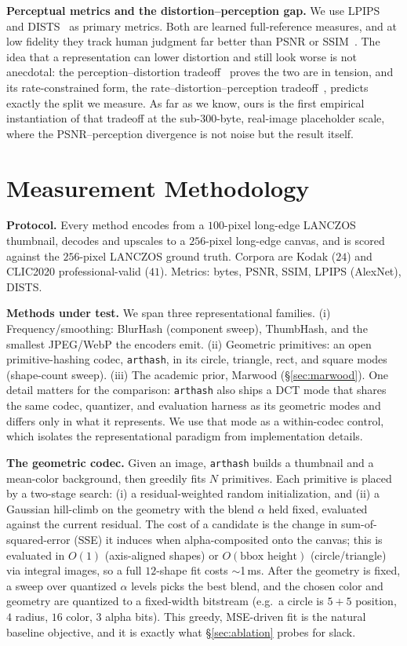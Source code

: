 \documentclass[11pt]{article}
\begin{document}
\textbf{Perceptual metrics and the distortion--perception gap.} We use
LPIPS~\cite{lpips} and DISTS~\cite{dists} as primary metrics. Both are learned
full-reference measures, and at low fidelity they track human judgment far
better than PSNR or SSIM~\cite{wang2009mse}. The idea that a representation can
lower distortion and still look worse is not anecdotal: the
perception--distortion tradeoff~\cite{blau2018perception} proves the two are in
tension, and its rate-constrained form, the rate--distortion--perception
tradeoff~\cite{rdp}, predicts exactly the split we measure. As far as we know,
ours is the first empirical instantiation of that tradeoff at the sub-300-byte,
real-image placeholder scale, where the PSNR--perception divergence is not noise
but the result itself.

\section{Measurement Methodology}\label{sec:method}
\textbf{Protocol.} Every method encodes from a $100$-pixel long-edge LANCZOS
thumbnail, decodes and upscales to a $256$-pixel long-edge canvas, and is scored
against the $256$-pixel LANCZOS ground truth. Corpora are Kodak ($24$) and
CLIC2020 professional-valid ($41$). Metrics: bytes, PSNR, SSIM, LPIPS (AlexNet),
DISTS.

\textbf{Methods under test.} We span three representational families. (i)
Frequency/smoothing: BlurHash (component sweep), ThumbHash, and the smallest
JPEG/WebP the encoders emit. (ii) Geometric primitives: an open
primitive-hashing codec, \texttt{arthash}, in its circle, triangle, rect, and
square modes (shape-count sweep). (iii) The academic prior, Marwood
(\S\ref{sec:marwood}). One detail matters for the comparison: \texttt{arthash}
also ships a DCT mode that shares the same codec, quantizer, and evaluation
harness as its geometric modes and differs only in what it represents. We use
that mode as a within-codec control, which isolates the representational
paradigm from implementation details.

\textbf{The geometric codec.} Given an image, \texttt{arthash} builds a
thumbnail and a mean-color background, then greedily fits $N$ primitives. Each
primitive is placed by a two-stage search: (i) a residual-weighted random
initialization, and (ii) a Gaussian hill-climb on the geometry with the blend
$\alpha$ held fixed, evaluated against the current residual. The cost of a
candidate is the change in sum-of-squared-error (SSE) it induces when
alpha-composited onto the canvas; this is evaluated in $O(1)$ (axis-aligned
shapes) or $O(\text{bbox height})$ (circle/triangle) via integral images, so a
full $12$-shape fit costs $\sim$1\,ms. After the geometry is fixed, a sweep over
quantized $\alpha$ levels picks the best blend, and the chosen color and geometry
are quantized to a fixed-width bitstream (e.g.\ a circle is $5{+}5$ position, $4$
radius, $16$ color, $3$ alpha bits). This greedy, MSE-driven fit is the natural
baseline objective, and it is exactly what \S\ref{sec:ablation} probes for slack.
\end{document}
